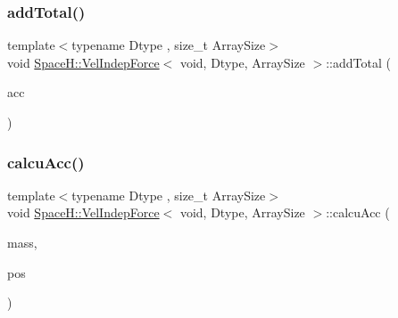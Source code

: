 \subsubsection{\texorpdfstring{add\+Total()}{addTotal()}}
{\footnotesize\ttfamily template$<$typename Dtype , size\+\_\+t Array\+Size$>$ \\
void \mbox{\hyperlink{struct_space_h_1_1_vel_indep_force}{Space\+H\+::\+Vel\+Indep\+Force}}$<$ void, Dtype, Array\+Size $>$\+::add\+Total (\begin{DoxyParamCaption}\item[{\mbox{\hyperlink{struct_space_h_1_1_vel_indep_force_3_01void_00_01_dtype_00_01_array_size_01_4_ab547eb9c08979f28c5afafae93480702}{Vector\+Array}} \&}]{acc }\end{DoxyParamCaption})\hspace{0.3cm}{\ttfamily [inline]}}

\mbox{\label{struct_space_h_1_1_vel_indep_force_3_01void_00_01_dtype_00_01_array_size_01_4_ad6233c1b9ec85756a21af735495adbfb}} 
\subsubsection{\texorpdfstring{calcu\+Acc()}{calcuAcc()}\hspace{0.1cm}{\footnotesize\ttfamily [1/2]}}
{\footnotesize\ttfamily template$<$typename Dtype , size\+\_\+t Array\+Size$>$ \\
void \mbox{\hyperlink{struct_space_h_1_1_vel_indep_force}{Space\+H\+::\+Vel\+Indep\+Force}}$<$ void, Dtype, Array\+Size $>$\+::calcu\+Acc (\begin{DoxyParamCaption}\item[{const \mbox{\hyperlink{struct_space_h_1_1_vel_indep_force_3_01void_00_01_dtype_00_01_array_size_01_4_abac00e98d91b617794c41acf2a4ee4d5}{Scalar\+Array}} \&}]{mass,  }\item[{const \mbox{\hyperlink{struct_space_h_1_1_vel_indep_force_3_01void_00_01_dtype_00_01_array_size_01_4_ab547eb9c08979f28c5afafae93480702}{Vector\+Array}} \&}]{pos }\end{DoxyParamCaption})\hspace{0.3cm}{\ttfamily [inline]}}

